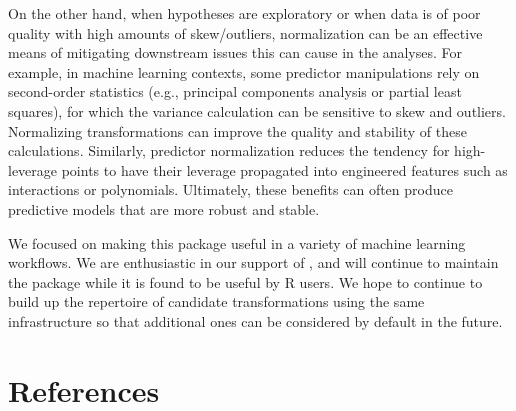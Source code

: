 On the other hand, when hypotheses are exploratory or when data is of
poor quality with high amounts of skew/outliers, normalization can be an
effective means of mitigating downstream issues this can cause in the
analyses. For example, in machine learning contexts, some predictor
manipulations rely on second-order statistics (e.g., principal
components analysis or partial least squares), for which the variance
calculation can be sensitive to skew and outliers. Normalizing
transformations can improve the quality and stability of these
calculations. Similarly, predictor normalization reduces the tendency
for high-leverage points to have their leverage propagated into
engineered features such as interactions or polynomials. Ultimately,
these benefits can often produce predictive models that are more robust
and stable.

We focused on making this package useful in a variety of machine
learning workflows. We are enthusiastic in our support of
, and will continue to maintain the package while it
is found to be useful by R users. We hope to continue to build up the
repertoire of candidate transformations using the same infrastructure so
that additional ones can be considered by default in the future.

\hypertarget{references}{%
\section{References}\label{references}}

\begin{verbatim}
\end{verbatim}



\address{%
Ryan A. Peterson\\
Department of Biostatistics and Informatics\\%
University of Colorado Anschutz Medical Campus 13001 East 17th Place
Aurora, Colorado 80045 ORCID: 0000-0002-4650-5798\\
%
\url{https://petersonr.github.io/}\\%
%
%
}
